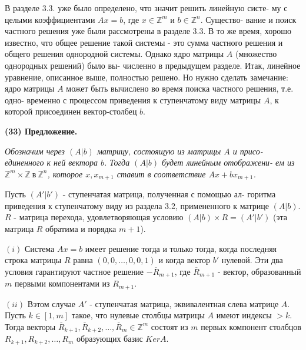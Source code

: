 	\noindent
	В разделе 3.3. уже было определено, что значит решить линейную систе-\linebreak
	му с целыми коэффициентами $Ax = b$, где $x \in \mathbb Z^m$ и $b \in \mathbb Z^n$. Существо-\linebreak
	вание и поиск частного решения уже были рассмотрены в разделе 3.3.\linebreak
	В то же время, хорошо известно, что общее решение такой системы -\linebreak
	это сумма частного решения и общего решения однородной системы.\linebreak
	Однако ядро матрицы $A$ (множество однородных решений) было вы-\linebreak
	численно в предыдущем разделе. Итак, линейное уравнение, описанное\linebreak
	выше, полностью решено. Но нужно сделать замечание: ядро матрицы\linebreak
	$A$ может быть вычислено во время поиска частного решения, т.е. одно-\linebreak
	временно с процессом приведения к ступенчатому виду матрицы $A$, к\linebreak
	которой присоединен вектор-столбец $b$.
	
	\noindent
	{\bf (33) Предложение.}
	
	{\it Обозначим через $(A | b)$ матрицу, состоящую из матрицы $A$ и присо-\linebreak
	единенного к ней вектора $b$. Тогда $(A | b)$ будет линейным отображени-\linebreak
	ем из $\mathbb Z^m \times \mathbb Z \ \text{в} \ \mathbb Z^n$, которое $x, x_{m + 1}$ ставит в соответствие $Ax + bx_{m + 1}$.
	
	Пусть $(A' | b')$ - ступенчатая матрица, полученная с помощью ал-\linebreak
	горитма приведения к ступенчатому виду из раздела 3.2, примененного\linebreak
	к матрице $(A | b)$. $R$ - матрица перехода, удовлетворяющая условию\linebreak
	$(A | b)\times R = (A' | b')$ (эта матрица $R$ обратима и порядка $m + 1$).
	
	$(i)$ Система $Ax = b$ имеет решение тогда и только тогда, когда\linebreak
	последняя строка матрицы $R$ равна $(0, 0, \ldots, 0, 0, 1)$ и когда вектор $b'$\linebreak
	нулевой. Эти два условия гарантируют частное решение $-\overline{R}_{m + 1}$, где\linebreak
	$\overline{R}_{m + 1}$ - вектор, образованный $m$ первыми компонентами из $R_{m + 1}$.
	
	$(ii)$ Вэтом случае $A'$ - ступенчатая матрица, эквивалентная слева\linebreak
	матрице $A$. Пусть $k \in [1, m]$ такое, что нулевые столбцы матрицы $A$\linebreak
	имеют индексы $> k$. Тогда векторы $\overline{R}_{k + 1}, \overline{R}_{k + 2}, \ldots, \overline{R}_{m} \in \mathbb Z^m$ состоят из\linebreak
	$m$ первых компонент столбцов $R_{k + 1}, R_{k + 2}, \ldots, R_{m}$ образующих базис\linebreak
	$KerA$.}
	
